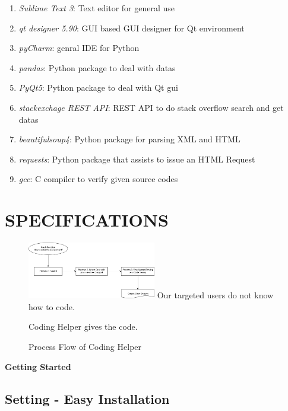 \documentclass[conference]{IEEEtran}
\begin{document}
\begin{enumerate}
  \item \textit{Sublime Text 3}: Text editor for general use
  \item \textit{qt designer 5.90}: GUI based GUI designer for Qt environment
  \item \textit{pyCharm}: genral IDE for Python
  \item \textit{pandas}: Python package to deal with datas
  \item \textit{PyQt5}: Python package to deal with Qt gui
  \item \textit{stackexchage REST API}: REST API to do stack overflow search and get datas
  \item \textit{beautifulsoup4}: Python package for parsing XML and HTML
  \item \textit{requests}: Python package that assists to issue an HTML Request
  \item \textit{gcc}: C compiler to verify given source codes
\end{enumerate}
\textit{}


\section{SPECIFICATIONS} %
\label{sec:specifications}

\begin{figure}[h]
\centering
\includegraphics[width=0.5\textwidth]{./figures/Process_Flow.png}
Our targeted users do not know how to code.

Coding Helper gives the code.
\caption{Process Flow of Coding Helper}
\label{fig_process_flow}
\end{figure}


\textbf{Getting Started}

\subsection{Setting - Easy Installation}
\end{document}
